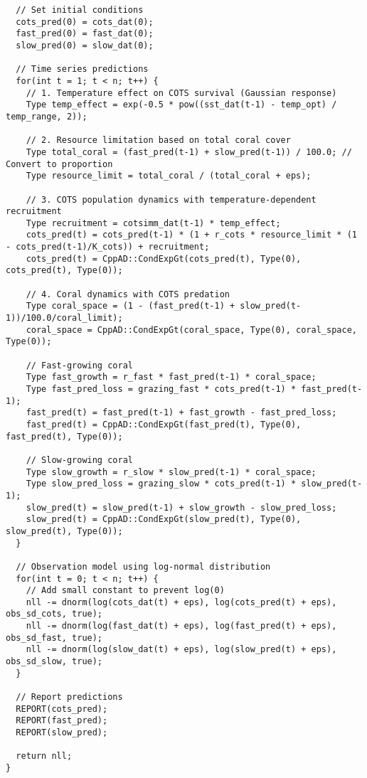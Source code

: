 \begin{lstlisting}
  // Set initial conditions
  cots_pred(0) = cots_dat(0);
  fast_pred(0) = fast_dat(0);
  slow_pred(0) = slow_dat(0);
  
  // Time series predictions
  for(int t = 1; t < n; t++) {
    // 1. Temperature effect on COTS survival (Gaussian response)
    Type temp_effect = exp(-0.5 * pow((sst_dat(t-1) - temp_opt) / temp_range, 2));
    
    // 2. Resource limitation based on total coral cover
    Type total_coral = (fast_pred(t-1) + slow_pred(t-1)) / 100.0; // Convert to proportion
    Type resource_limit = total_coral / (total_coral + eps);
    
    // 3. COTS population dynamics with temperature-dependent recruitment
    Type recruitment = cotsimm_dat(t-1) * temp_effect;
    cots_pred(t) = cots_pred(t-1) * (1 + r_cots * resource_limit * (1 - cots_pred(t-1)/K_cots)) + recruitment;
    cots_pred(t) = CppAD::CondExpGt(cots_pred(t), Type(0), cots_pred(t), Type(0));
    
    // 4. Coral dynamics with COTS predation
    Type coral_space = (1 - (fast_pred(t-1) + slow_pred(t-1))/100.0/coral_limit);
    coral_space = CppAD::CondExpGt(coral_space, Type(0), coral_space, Type(0));
    
    // Fast-growing coral
    Type fast_growth = r_fast * fast_pred(t-1) * coral_space;
    Type fast_pred_loss = grazing_fast * cots_pred(t-1) * fast_pred(t-1);
    fast_pred(t) = fast_pred(t-1) + fast_growth - fast_pred_loss;
    fast_pred(t) = CppAD::CondExpGt(fast_pred(t), Type(0), fast_pred(t), Type(0));
    
    // Slow-growing coral
    Type slow_growth = r_slow * slow_pred(t-1) * coral_space;
    Type slow_pred_loss = grazing_slow * cots_pred(t-1) * slow_pred(t-1);
    slow_pred(t) = slow_pred(t-1) + slow_growth - slow_pred_loss;
    slow_pred(t) = CppAD::CondExpGt(slow_pred(t), Type(0), slow_pred(t), Type(0));
  }
  
  // Observation model using log-normal distribution
  for(int t = 0; t < n; t++) {
    // Add small constant to prevent log(0)
    nll -= dnorm(log(cots_dat(t) + eps), log(cots_pred(t) + eps), obs_sd_cots, true);
    nll -= dnorm(log(fast_dat(t) + eps), log(fast_pred(t) + eps), obs_sd_fast, true);
    nll -= dnorm(log(slow_dat(t) + eps), log(slow_pred(t) + eps), obs_sd_slow, true);
  }
  
  // Report predictions
  REPORT(cots_pred);
  REPORT(fast_pred);
  REPORT(slow_pred);
  
  return nll;
}
\end{lstlisting}

